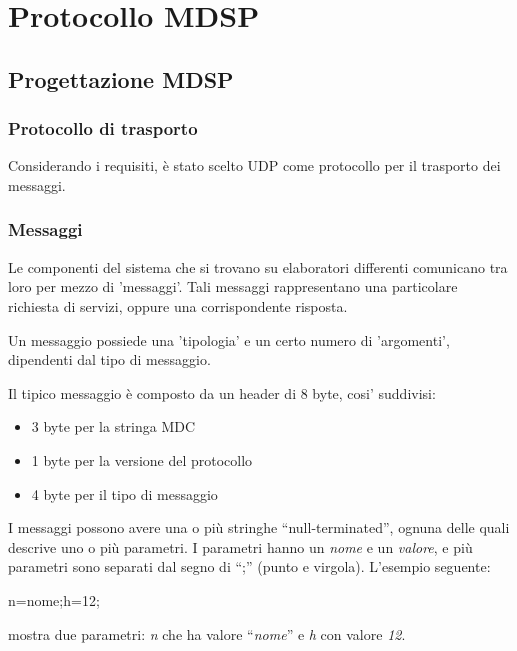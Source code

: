 \chapter{Protocollo MDSP}
\label{cap:protocollo}
\section{Progettazione MDSP}

\subsection{Protocollo di trasporto}
Considerando i requisiti, è stato scelto UDP come protocollo per il trasporto
dei messaggi.

\subsection{Messaggi}


Le componenti del sistema che si trovano su elaboratori differenti comunicano tra
loro per mezzo di 'messaggi'. Tali messaggi rappresentano una particolare
richiesta di servizi, oppure una corrispondente risposta.

Un messaggio possiede una 'tipologia' e un certo numero di 'argomenti', dipendenti dal tipo di messaggio.

Il tipico messaggio è composto da un header di 8 byte, cosi' suddivisi:



\begin{itemize}
\item 3 byte per la stringa MDC

\item 1 byte per la versione del protocollo

\item 4 byte per il tipo di messaggio
\end{itemize}

I messaggi possono avere una o più stringhe ``null-terminated'',
ognuna delle quali descrive uno o più parametri. I parametri hanno un
\emph{nome} e un \emph{valore}, e più parametri sono separati dal segno di
``;'' (punto e virgola). L'esempio seguente:

\begin{code}
n=nome;h=12;
\end{code}

mostra due parametri: \emph{n} che ha valore ``\emph{nome}'' e \emph{h} con
valore \emph{12}.

